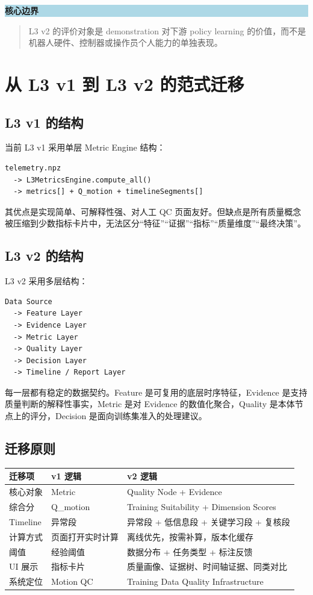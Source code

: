 \documentclass[UTF8,zihao=-4]{ctexart}
\newenvironment{notebox}[1]{\vspace{0.5em}\noindent\colorbox{LightBlue}{\parbox{0.96\linewidth}{\textbf{#1}}}\par\vspace{-0.2em}\begin{quote}\small}{\end{quote}\vspace{0.3em}}
\begin{document}
\begin{notebox}{核心边界}
L3 v2 的评价对象是 demonstration 对下游 policy learning 的价值，而不是机器人硬件、控制器或操作员个人能力的单独表现。
\end{notebox}

\section{从 L3 v1 到 L3 v2 的范式迁移}

\subsection{L3 v1 的结构}

当前 L3 v1 采用单层 Metric Engine 结构：

\begin{verbatim}
telemetry.npz
  -> L3MetricsEngine.compute_all()
  -> metrics[] + Q_motion + timelineSegments[]
\end{verbatim}

其优点是实现简单、可解释性强、对人工 QC 页面友好。但缺点是所有质量概念被压缩到少数指标卡片中，无法区分“特征”“证据”“指标”“质量维度”“最终决策”。

\subsection{L3 v2 的结构}

L3 v2 采用多层结构：

\begin{verbatim}
Data Source
  -> Feature Layer
  -> Evidence Layer
  -> Metric Layer
  -> Quality Layer
  -> Decision Layer
  -> Timeline / Report Layer
\end{verbatim}

每一层都有稳定的数据契约。Feature 是可复用的底层时序特征，Evidence 是支持质量判断的解释性事实，Metric 是对 Evidence 的数值化聚合，Quality 是本体节点上的评分，Decision 是面向训练集准入的处理建议。

\subsection{迁移原则}

\begin{longtable}{L{3.2cm} L{5.1cm} L{5.9cm}}
\toprule
迁移项 & v1 逻辑 & v2 逻辑 \\
\midrule
核心对象 & Metric & Quality Node + Evidence \\
综合分 & Q\_motion & Training Suitability + Dimension Scores \\
Timeline & 异常段 & 异常段 + 低信息段 + 关键学习段 + 复核段 \\
计算方式 & 页面打开实时计算 & 离线优先，按需补算，版本化缓存 \\
阈值 & 经验阈值 & 数据分布 + 任务类型 + 标注反馈 \\
UI 展示 & 指标卡片 & 质量画像、证据树、时间轴证据、同类对比 \\
系统定位 & Motion QC & Training Data Quality Infrastructure \\
\bottomrule
\end{longtable}
\end{document}
